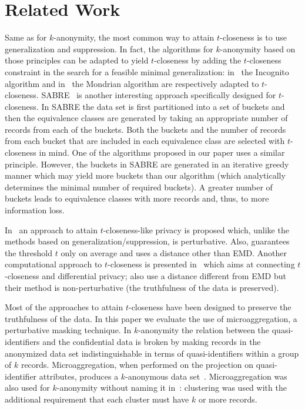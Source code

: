 \documentclass[10pt,journal,compsoc]{IEEEtran}
\theoremstyle{definition}
\theoremstyle{plain}
\begin{document}
\section{Related Work}
\label{sec:related_work}
Same as for $k$-anonymity, the most common way to attain $t$-closeness
is to use generalization and suppression. In fact, the algorithms
for $k$-anonymity based on those principles 
can be adapted to yield $t$-closeness by adding the
$t$-closeness constraint in the search for a feasible
minimal generalization: in~\cite{Li2007t-Closeness} the Incognito
algorithm and in~\cite{Li2010Closeness} the Mondrian algorithm are
respectively adapted to $t$-closeness. 
SABRE~\cite{Cao} is another interesting approach specifically designed 
for $t$-closeness. In SABRE the data set is first partitioned into 
a set of buckets and 
then the equivalence classes are generated 
by taking an appropriate number of records 
from each of the buckets. Both the buckets and the number of records from
each bucket that are included in each equivalence class 
are selected with $t$-closeness
in mind. One of the algorithms proposed in our paper uses a similar
principle. However,
the buckets in SABRE are generated in an iterative greedy manner
which may yield more buckets than our algorithm (which 
analytically determines
the minimal number of required buckets). 
A greater number of buckets
leads to equivalence classes with more records and, thus, to more information loss.

In~\cite{Rebollo} an approach to attain $t$-closeness-like privacy is
 proposed
which, unlike the methods based on generalization/suppression, is perturbative. 
Also, \cite{Rebollo} guarantees the threshold $t$ only on 
average and uses a distance 
other than EMD. Another computational approach to $t$-closeness 
is presented 
in~\cite{DomingoSoria15,Soria2013differential} which aims at 
connecting $t$-closeness and
differential privacy; \cite{DomingoSoria15,Soria2013differential} also
use a distance different from EMD but their method
is non-perturbative (the truthfulness of the data is preserved).

Most of the approaches to attain $t$-closeness have been designed to
preserve the truthfulness of the data. In this paper we evaluate the use of
microaggregation, a perturbative masking technique. 
In $k$-anonymity the relation between the quasi-identifiers and the
confidential data is broken by making records in the anonymized data
set indistinguishable in terms of quasi-identifiers within a group
of $k$ records. Microaggregation, when performed on the 
projection on quasi-identifier
attributes, produces a $k$-anonymous data set~\cite{Domingo2005Ordinal}.
Microaggregation was also used for $k$-anonymity without naming it 
in~\cite{Li2008LocalRecoding}: clustering was used with the 
additional requirement that each cluster must have $k$ or more 
records.
\end{document}
